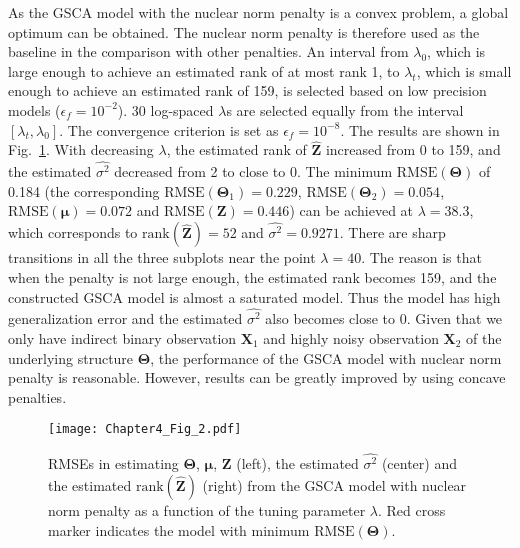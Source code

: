 As the GSCA model with the nuclear norm penalty is a convex problem, a global optimum can be obtained. The nuclear norm penalty is therefore used as the baseline in the comparison with other penalties. An interval from $\lambda_0$, which is large enough to achieve an estimated rank of at most rank 1, to $\lambda_{t}$, which is small enough to achieve an estimated rank of 159, is selected based on low precision models ($\epsilon_f=10^{-2}$). 30 log-spaced $\lambda$s are selected equally from the interval $[\lambda_{t},\lambda_{0}]$. The convergence criterion is set as $\epsilon_f = 10^{-8}$. The results are shown in Fig.~\ref{chapter4_fig:2}. With decreasing $\lambda$, the estimated rank of $\hat{\mathbf{Z}}$ increased from 0 to 159, and the estimated $\hat{\sigma^2}$ decreased from 2 to close to 0. The minimum $\text{RMSE}(\mathbf{\Theta})$ of 0.184 (the corresponding $\text{RMSE}(\mathbf{\Theta}_1)=0.229$, $\text{RMSE}(\mathbf{\Theta}_2)=0.054$, $\text{RMSE}(\bm{\mu}) = 0.072$ and $\text{RMSE}(\mathbf{Z})=0.446$) can be achieved at $\lambda=38.3$, which corresponds to $\text{rank}(\hat{\mathbf{Z}})=52$ and $\hat{\sigma^2}=0.9271$. There are sharp transitions in all the three subplots near the point $\lambda=40$. The reason is that when the penalty is not large enough, the estimated rank becomes 159, and the constructed GSCA model is almost a saturated model. Thus the model has high generalization error and the estimated $\hat{\sigma^2}$ also becomes close to 0. Given that we only have indirect binary observation $\mathbf{X}_1$ and highly noisy observation $\mathbf{X}_2$ of the underlying structure $\mathbf{\Theta}$, the performance of the GSCA model with nuclear norm penalty is reasonable. However, results can be greatly improved by using concave penalties.
\begin{figure}[htbp]
    \centering
    \texttt{[image: Chapter4\_Fig\_2.pdf]}
    \caption{RMSEs in estimating $\mathbf{\Theta}$, $\bm{\mu}$, $\mathbf{Z}$ (left), the estimated $\hat{\sigma^2}$ (center) and the estimated $\text{rank}(\hat{\mathbf{Z}})$ (right) from the GSCA model with nuclear norm penalty as a function of the tuning parameter $\lambda$. Red cross marker indicates the model with minimum $\text{RMSE}(\mathbf{\Theta})$.}
    \label{chapter4_fig:2}
\end{figure}

